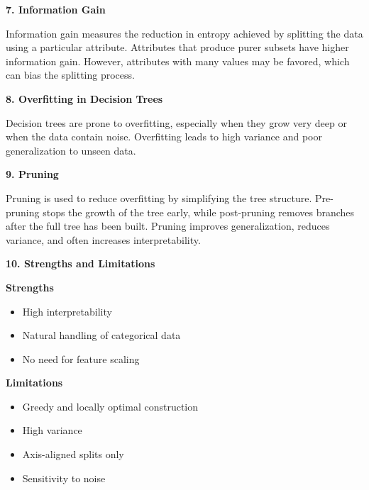 \documentclass{article}
\begin{document}
	\bigskip
	
	\textbf{7. Information Gain}
	
	Information gain measures the reduction in entropy achieved by splitting the
	data using a particular attribute. Attributes that produce purer subsets have
	higher information gain. However, attributes with many values may be favored,
	which can bias the splitting process.
	
	\bigskip
	
	\textbf{8. Overfitting in Decision Trees}
	
	Decision trees are prone to overfitting, especially when they grow very deep or
	when the data contain noise. Overfitting leads to high variance and poor
	generalization to unseen data.
	
	\bigskip
	
	\textbf{9. Pruning}
	
	Pruning is used to reduce overfitting by simplifying the tree structure.
	Pre-pruning stops the growth of the tree early, while post-pruning removes
	branches after the full tree has been built. Pruning improves generalization,
	reduces variance, and often increases interpretability.
	
	\bigskip
	
	\textbf{10. Strengths and Limitations}
	
	\textbf{Strengths}
	\begin{itemize}
		\item High interpretability
		\item Natural handling of categorical data
		\item No need for feature scaling
	\end{itemize}
	
	\textbf{Limitations}
	\begin{itemize}
		\item Greedy and locally optimal construction
		\item High variance
		\item Axis-aligned splits only
		\item Sensitivity to noise
	\end{itemize}
	
\end{document}
